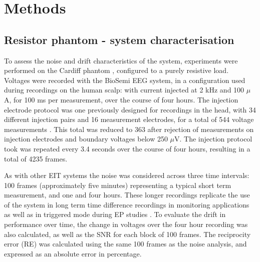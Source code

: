 \section{Methods}
\subsection{Resistor phantom - system characterisation}

To assess the noise and drift characteristics of the system, experiments were performed on the Cardiff phantom \cite{griffiths1995cole}, configured to a purely resistive load. Voltages were recorded with the BioSemi EEG system, in a configuration used during recordings on the human scalp: with current injected at 2 kHz and 100 $\mu$A, for 100 ms per measurement, over the course of four hours. The injection electrode protocol was one previously designed for recordings in the head, with 34 different injection pairs and 16 measurement electrodes, for a total of 544 voltage measurements \cite{Fabrizi2009}. This total was reduced to 363 after rejection of measurements on injection electrodes and boundary voltages below 250 $\mu$V. The injection protocol took was repeated every 3.4 seconds over the course of four hours, resulting in a total of 4235 frames. 

As with other EIT systems \cite{oh2007multi} the noise was considered across three time intervals: 100 frames (approximately five minutes) representing a typical short term measurement, and one and four hours. These longer recordings replicate the use of the system in long term time difference recordings in monitoring applications \cite{fu2014use} \cite{adler2012whither} as well as in triggered mode during EP studies \cite{Aristovich_2016}. To evaluate the drift in performance over time, the change in voltages over the four hour recording was also calculated, as well as the SNR for each block of 100 frames. The reciprocity error (RE) was calculated using the same 100 frames as the noise analysis, and expressed as an absolute error in percentage.

